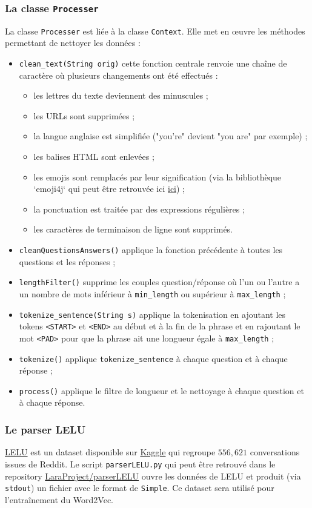 \documentclass[10pt,a4paper]{article}
\begin{document}
\subsubsection{La classe \texttt{Processer}}
La classe \texttt{Processer} est liée à la classe \texttt{Context}. Elle met en œuvre les méthodes permettant de nettoyer les données :
\begin{itemize}
\item \texttt{clean\_text(String orig)} cette fonction centrale renvoie une chaîne de caractère où plusieurs changements ont été effectués :
\begin{itemize}
\item les lettres du texte deviennent des minuscules ;
\item les URLs sont supprimées ;
\item la langue anglaise est simplifiée ("you're" devient "you are" par exemple) ;
\item les balises HTML sont enlevées ;
\item les emojis sont remplacés par leur signification (via la bibliothèque `emoji4j` qui peut être retrouvée ici \href{https://github.com/kcthota/emoji4j}{ici}) ;
\item la ponctuation est traitée par des expressions régulières ;
\item les caractères de terminaison de ligne sont supprimés.
\end{itemize}
\item \texttt{cleanQuestionsAnswers()} applique la fonction précédente à toutes les questions et les réponses ;
\item \texttt{lengthFilter()} supprime les couples question/réponse où l'un ou l'autre a un nombre de mots inférieur à \texttt{min\_length} ou supérieur à \texttt{max\_length} ;
\item \texttt{tokenize\_sentence(String s)} applique la tokenisation en ajoutant les tokens \texttt{<START>} et \texttt{<END>} au début et à la fin de la phrase et en rajoutant le mot \texttt{<PAD>} pour que la phrase ait une longueur égale à \texttt{max\_length} ;
\item \texttt{tokenize()} applique \texttt{tokenize\_sentence} à chaque question et à chaque réponse ;
\item \texttt{process()} applique le filtre de longueur et le nettoyage à chaque question et à chaque réponse.
\end{itemize}
\subsubsection{Le parser LELU}
\href{https://www.kaggle.com/breandan/french-reddit-discussion}{LELU} est un dataset disponible sur \href{https://www.kaggle.com/breandan/french-reddit-discussion}{Kaggle} qui regroupe $556,621$ conversations issues de Reddit. Le script \texttt{parserLELU.py} qui peut être retrouvé dans le repository \href{https://github.com/LaraProject/parserLELU}{LaraProject/parserLELU} ouvre les données de LELU et produit (via \texttt{stdout}) un fichier avec le format de \texttt{Simple}. Ce dataset sera utilisé pour l'entraînement du Word2Vec.
\end{document}
